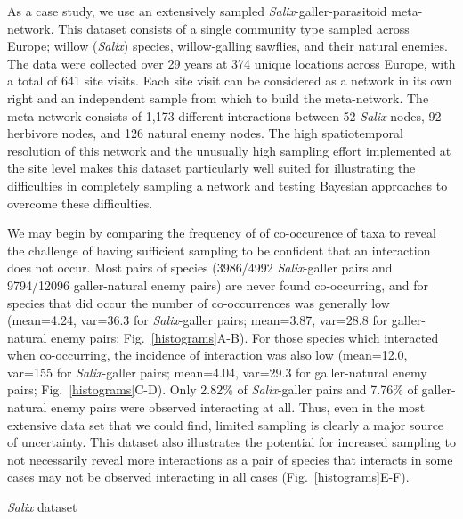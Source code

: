 \documentclass[12pt]{article}
\begin{document}
\begin{floatbox}{}

    
    \indent As a case study, we use an extensively sampled \emph{Salix}-galler-parasitoid meta-network. This dataset consists of a single community type sampled across Europe; willow (\emph{Salix}) species, willow-galling sawflies, and their natural enemies. The data were collected over 29 years at 374 unique locations across Europe, with a total of 641 site visits. Each site visit can be considered as a network in its own right and an independent sample from which to build the meta-network. The meta-network consists of 1,173 different interactions between 52 \emph{Salix} nodes, 92 herbivore nodes, and 126 natural enemy nodes. The high spatiotemporal resolution of this network and the unusually high sampling effort implemented at the site level makes this dataset particularly well suited for illustrating the difficulties in completely sampling a network and testing Bayesian approaches to overcome these difficulties.


    \indent We may begin by comparing the frequency of of co-occurence of taxa to reveal the challenge of having sufficient sampling to be confident that an interaction does not occur. Most pairs of species (3986/4992 \emph{Salix}-galler pairs and  9794/12096 galler-natural enemy pairs) are never found co-occurring, and for species that did occur the number of co-occurrences was generally low (mean=4.24, var=36.3 for \emph{Salix}-galler pairs; mean=3.87, var=28.8 for galler-natural enemy pairs; Fig.~\ref{histograms}A-B). For those species which interacted when co-occurring, the incidence of interaction was also low (mean=12.0, var=155 for \emph{Salix}-galler pairs; mean=4.04, var=29.3 for galler-natural enemy pairs; Fig.~\ref{histograms}C-D). Only 2.82\% of \emph{Salix}-galler pairs and 7.76\% of galler-natural enemy pairs were observed interacting at all. Thus, even in the most extensive data set that we could find, limited sampling is clearly a major source of uncertainty. This dataset also illustrates the potential for increased sampling to not necessarily reveal more interactions as a pair of species that interacts in some cases may not be observed interacting in all cases (Fig.~\ref{histograms}E-F). 

  \caption{\emph{Salix} dataset}
  \label{box1}
\end{floatbox}
\end{document}
